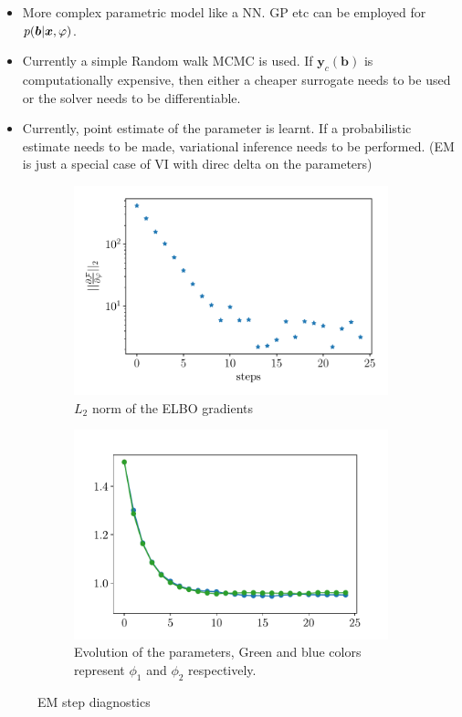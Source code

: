 \documentclass[a4paper,11pt]{article}
\begin{document}
\begin{itemize}
    \item More complex parametric model like a NN. GP etc can be employed for $p(\boldsymbol{b} | \boldsymbol{x}, \varphi)$.
    \item Currently a simple Random walk MCMC is used. If $\bm{y}_c(\bm b)$ is computationally expensive, then either a cheaper surrogate needs to be used or the solver needs to be differentiable.
    \item Currently, point estimate of the parameter is learnt. If a probabilistic estimate needs to be made, variational inference needs to be performed. (EM is just a special case of VI with direc delta on the parameters)
\end{itemize}



\begin{figure}[!htpb]
\centering
\begin{subfigure}{0.45\textwidth}
    \includegraphics[width=\textwidth]{fig/grad_07_07_2022.pdf}
    \caption{$L_2$ norm of the ELBO gradients}
    \label{fig:grad_EM}
\end{subfigure}
\hfill
\begin{subfigure}{0.45\textwidth}
    \includegraphics[width=\textwidth]{fig/para_individual_updated.pdf}
    \caption{Evolution of the parameters, Green and blue colors represent $\phi_1$ and $\phi_2$ respectively.}
    \label{fig:para_EM}
\end{subfigure}
\caption{EM step diagnostics}
\label{fig:EM_diagnostics}
\end{figure}
\end{document}
